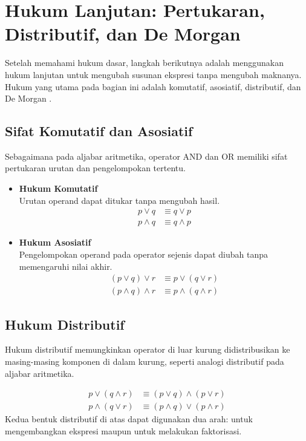 \section{Hukum Lanjutan: Pertukaran, Distributif, dan De Morgan}

Setelah memahami hukum dasar, langkah berikutnya adalah menggunakan hukum lanjutan untuk mengubah susunan ekspresi tanpa mengubah maknanya. Hukum yang utama pada bagian ini adalah komutatif, asosiatif, distributif, dan De Morgan \cite{rosen2019}.

\subsection{Sifat Komutatif dan Asosiatif}

Sebagaimana pada aljabar aritmetika, operator AND dan OR memiliki sifat pertukaran urutan dan pengelompokan tertentu.

\begin{itemize}
    \item \textbf{Hukum Komutatif} \\
    Urutan operand dapat ditukar tanpa mengubah hasil.
    \begin{align*}
        p \vee q &\equiv q \vee p \\
        p \wedge q &\equiv q \wedge p 
    \end{align*}

    \item \textbf{Hukum Asosiatif} \\
    Pengelompokan operand pada operator sejenis dapat diubah tanpa memengaruhi nilai akhir.
    \begin{align*}
        (p \vee q) \vee r &\equiv p \vee (q \vee r) \\
        (p \wedge q) \wedge r &\equiv p \wedge (q \wedge r) 
    \end{align*}
\end{itemize}

\subsection{Hukum Distributif}

Hukum distributif memungkinkan operator di luar kurung didistribusikan ke masing-masing komponen di dalam kurung, seperti analogi distributif pada aljabar aritmetika.

\begin{align*}
    p \vee (q \wedge r) &\equiv (p \vee q) \wedge (p \vee r) \\
    p \wedge (q \vee r) &\equiv (p \wedge q) \vee (p \wedge r) 
\end{align*}
Kedua bentuk distributif di atas dapat digunakan dua arah: untuk mengembangkan ekspresi maupun untuk melakukan faktorisasi.

